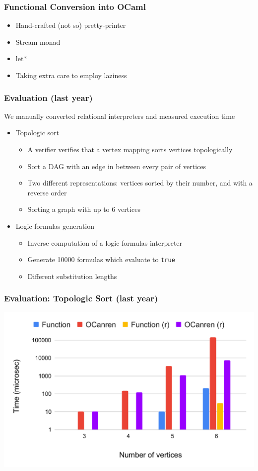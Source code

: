 \documentclass[xcolor=table]{beamer}
\begin{document}
\begin{frame}[fragile]
  \frametitle{Functional Conversion into OCaml}
  \begin{itemize}
    \item Hand-crafted (not so) pretty-printer
    \item Stream monad
    \item let*
    \item Taking extra care to employ laziness
  \end{itemize}
\end{frame}

\begin{frame}[fragile]
  \frametitle{Evaluation (last year)}
  \begin{center}
    We manually converted relational interpreters and measured execution time
  \end{center}

  \begin{itemize}
    \item Topologic sort
    \begin{itemize}
      \item A verifier verifies that a vertex mapping sorts vertices topologically
      \item Sort a DAG with an edge in between every pair of vertices
      \item Two different representations: vertices sorted by their number, and with a reverse order
      \item Sorting a graph with up to 6 vertices
    \end{itemize}
    \item Logic formulas generation
    \begin{itemize}
      \item Inverse computation of a logic formulas interpreter
      \item Generate 10000 formulas which evaluate to \texttt{true}
      \item Different substitution lengths
    \end{itemize}
  \end{itemize}
\end{frame}

\begin{frame}[fragile]
  \frametitle{Evaluation: Topologic Sort (last year)}
  \includegraphics[width=\textwidth]{fig/eval/topsort.pdf}
\end{frame}
\end{document}
